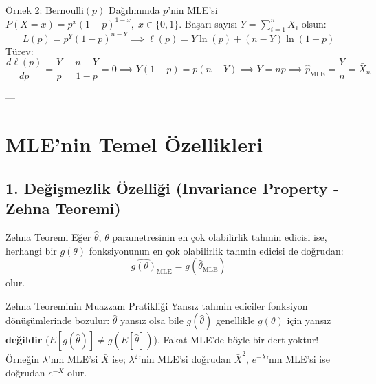\documentclass[12pt,a4paper]{article}
\begin{document}
\begin{ornek}{Örnek 2: $\text{Bernoulli}(p)$ Dağılımında $p$'nin MLE'si}
$P(X=x) = p^x (1-p)^{1-x}, \; x \in \{0, 1\}$. Başarı sayısı $Y = \sum_{i=1}^n X_i$ olsun:
\begin{equation}
    L(p) = p^Y (1-p)^{n-Y} \implies \ell(p) = Y \ln(p) + (n-Y) \ln(1-p)
\end{equation}
Türev:
\begin{equation}
    \frac{d\ell(p)}{dp} = \frac{Y}{p} - \frac{n-Y}{1-p} = 0 \implies Y(1-p) = p(n-Y) \implies Y = np \implies \boxed{\hat{p}_{\text{MLE}} = \frac{Y}{n} = \bar{X}_n}
\end{equation}
\end{ornek}

---

\section{MLE'nin Temel Özellikleri}

\subsection{1. Değişmezlik Özelliği (Invariance Property - Zehna Teoremi)}

\begin{tanim}{Zehna Teoremi}
Eğer $\hat{\theta}$, $\theta$ parametresinin en çok olabilirlik tahmin edicisi ise, herhangi bir $g(\theta)$ fonksiyonunun en çok olabilirlik tahmin edicisi de doğrudan:
\begin{equation}
    \boxed{\widehat{g(\theta)}_{\text{MLE}} = g(\hat{\theta}_{\text{MLE}})}
\end{equation}
olur.
\end{tanim}

\begin{sezgi}{Zehna Teoreminin Muazzam Pratikliği}
Yansız tahmin ediciler fonksiyon dönüşümlerinde bozulur: $\hat{\theta}$ yansız olsa bile $g(\hat{\theta})$ genellikle $g(\theta)$ için yansız \textbf{değildir} ($E[g(\hat{\theta})] \neq g(E[\hat{\theta}])$).  
Fakat MLE'de böyle bir dert yoktur! Örneğin $\lambda$'nın MLE'si $\bar{X}$ ise; $\lambda^2$'nin MLE'si doğrudan $\bar{X}^2$, $e^{-\lambda}$'nın MLE'si ise doğrudan $e^{-\bar{X}}$ olur.
\end{sezgi}
\end{document}
